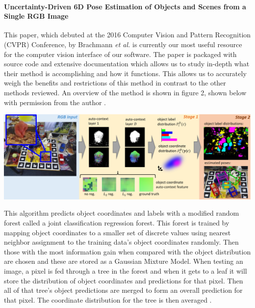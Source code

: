 \documentclass[12pt]{article}
\let\origfigure=\figure
\let\endorigfigure=\endfigure
\renewenvironment{figure}[1][]{%
  \origfigure[H]
}{%
  \endorigfigure
}
\begin{document}
\paragraph{Uncertainty-Driven 6D Pose Estimation of Objects and Scenes
from a Single RGB
Image}\label{uncertainty-driven-6d-pose-estimation-of-objects-and-scenes-from-a-single-rgb-image}

This paper, which debuted at the 2016 Computer Vision and Pattern
Recognition (CVPR) Conference, by Brachmann \emph{et al.} is currently
our most useful resource for the computer vision interface of our
software. The paper is packaged with source code and extensive
documentation which allows us to study in-depth what their method is
accomplishing and how it functions. This allows us to accurately weigh
the benefits and restrictions of this method in contrast to the other
methods reviewed. An overview of the method is shown in figure 2, shown
below with permission from the author \autocite{brachmann}.

\begin{figure}
\centering
\includegraphics{Pictures/figure2.png}
\caption{Overview of the Brachmann \emph{et al.} Method}
\end{figure}

This algorithm predicts object coordinates and labels with a modified
random forest called a joint classification regression forest. This
forest is trained by mapping object coordinates to a smaller set of
discrete values using nearest neighbor assignment to the training data's
object coordinates randomly. Then those with the most information gain
when compared with the object distribution are chosen and these are
stored as a Gaussian Mixture Model. When testing an image, a pixel is
fed through a tree in the forest and when it gets to a leaf it will
store the distribution of object coordinates and predictions for that
pixel. Then all of that tree's object predictions are merged to form an
overall prediction for that pixel. The coordinate distribution for the
tree is then averaged \autocite{brachmann}.
\end{document}
